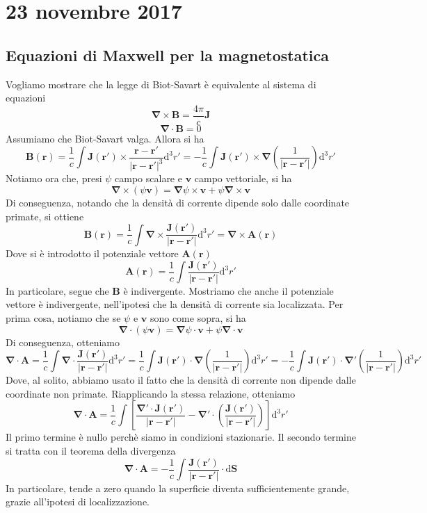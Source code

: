 \documentclass[a4paper,11pt]{book}
\newcommand{\dif}{\mathrm{d}}
\let\oldnabla\nabla
\renewcommand{\nabla}{\vec{\oldnabla}}
\renewcommand{\vec}[1]{\mathbf{#1}}
\theoremstyle{theorem}
\theoremstyle{definition}
\begin{document}
\section{23 novembre 2017}
\subsection{Equazioni di Maxwell per la magnetostatica}
Vogliamo mostrare che la legge di Biot-Savart è equivalente al sistema di equazioni
\[\nabla\times\vec{B}=\frac{4\pi}{c}\vec{J}\]
\[\nabla\cdot\vec{B}=0\]
Assumiamo che Biot-Savart valga. Allora si ha
\[\vec{B}(\vec{r})=\frac{1}{c}\int\vec{J}(\vec{r}')\times\frac{\vec{r}-\vec{r}'}{|\vec{r}-\vec{r}'|^3}\dif^3r'=-\frac{1}{c}\int\vec{J}(\vec{r}')\times\nabla\left(\frac{1}{|\vec{r}-\vec{r}'|}\right)\dif^3r'\]
Notiamo ora che, presi $\psi$ campo scalare e $\vec{v}$ campo vettoriale, si ha
\[\nabla\times(\psi\vec{v})=\nabla\psi\times\vec{v}+\psi\nabla\times\vec{v}\]
Di conseguenza, notando che la densità di corrente dipende solo dalle coordinate primate, si ottiene
\[\vec{B}(\vec{r})=\frac{1}{c}\int\nabla\times\frac{\vec{J}(\vec{r}')}{|\vec{r}-\vec{r}'|}\dif^3r'=\nabla\times\vec{A}(\vec{r})\]
Dove si è introdotto il potenziale vettore $\vec{A}(\vec{r})$
\[\vec{A}(\vec{r})=\frac{1}{c}\int\frac{\vec{J}(\vec{r}')}{|\vec{r}-\vec{r}'|}\dif^3r'\]
In particolare, segue che $\vec{B}$ è indivergente. Mostriamo che anche il potenziale vettore è indivergente, nell'ipotesi che la densità di corrente sia localizzata. Per prima cosa, notiamo che se $\psi$ e $\vec{v}$ sono come sopra, si ha
\[\nabla\cdot(\psi\vec{v})=\nabla\psi\cdot\vec{v}+\psi\nabla\cdot\vec{v}\]
Di conseguenza, otteniamo
\[\nabla\cdot\vec{A}=\frac{1}{c}\int\nabla\cdot\frac{\vec{J}(\vec{r}')}{|\vec{r}-\vec{r}'|}\dif^3r'=\frac{1}{c}\int\vec{J}(\vec{r}')\cdot\nabla\left(\frac{1}{|\vec{r}-\vec{r}'|}\right)\dif^3r'=-\frac{1}{c}\int\vec{J}(\vec{r}')\cdot\nabla'\left(\frac{1}{|\vec{r}-\vec{r}'|}\right)\dif^3r'\]
Dove, al solito, abbiamo usato il fatto che la densità di corrente non dipende dalle coordinate non primate. Riapplicando la stessa relazione, otteniamo
\[\nabla\cdot\vec{A}=\frac{1}{c}\int\left[\frac{\nabla'\cdot\vec{J}(\vec{r}')}{|\vec{r}-\vec{r}'|}-\nabla'\cdot\left(\frac{\vec{J}(\vec{r}')}{|\vec{r}-\vec{r}'|}\right)\right]\dif^3r'\]
Il primo termine è nullo perchè siamo in condizioni stazionarie. Il secondo termine si tratta con il teorema della divergenza
\[\nabla\cdot\vec{A}=-\frac{1}{c}\int\frac{\vec{J}(\vec{r}')}{|\vec{r}-\vec{r}'|}\cdot\dif\vec{S}\]
In particolare, tende a zero quando la superficie diventa sufficientemente grande, grazie all'ipotesi di localizzazione. 
\end{document}
